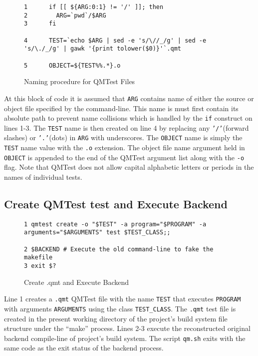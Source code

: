\begin{figure}[!ht]
{\scriptsize
\begin{verbatim}
1      if [[ ${ARG:0:1} != '/' ]]; then
2        ARG=`pwd`/$ARG
3      fi
                                                                                
4      TEST=`echo $ARG | sed -e 's/\//_/g' | sed -e 's/\./_/g' | gawk '{print tolower($0)}'`.qmt
                                                                                
5      OBJECT=${TEST%%.*}.o
\end{verbatim}
}
\caption{Naming procedure for QMTest Files}
\end{figure}

At this block of code it is assumed that {\tt ARG} contains name of either the 
source or object file specified by the command-line. This name is must first
contain its absolute path to prevent name collisions which is handled by the
{\tt if} construct on lines 1-3. The {\tt TEST} name is then created on line 4
by replacing any {\tt '/'}(forward slashes) or {\tt '.'}(dots) in {\tt ARG} 
with underscores. The {\tt OBJECT} name is simply the {\tt TEST} name value
with the {\tt.o} extension. The object file name argument held in {\tt OBJECT}
is appended to the end of the QMTest argument list along with the {\tt -o} 
flag. Note that QMTest does not allow capital alphabetic letters or periods
in the names of individual tests.

\subsection{Create QMTest test and Execute Backend}

\begin{figure}[!ht]
{\scriptsize
\begin{verbatim}
1 qmtest create -o "$TEST" -a program="$PROGRAM" -a arguments="$ARGUMENTS" test $TEST_CLASS;;
                                                                                
2 $BACKEND # Execute the old command-line to fake the makefile
3 exit $?
\end{verbatim}
}
\caption{Create .qmt and Execute Backend}
\end{figure}

Line 1 creates a {\tt .qmt} QMTest file with the name {\tt TEST} that executes
{\tt PROGRAM} with arguments {\tt ARGUMENTS} using the class {\tt TEST\_CLASS}.
The {\tt .qmt} test file is created in the present working directory of the
project's build system file structure under the ``make'' process.
Lines 2-3 execute the reconstructed original backend compile-line of project's
build system. The script {\tt qm.sh} exits with the same code as the exit
status of the backend process.

